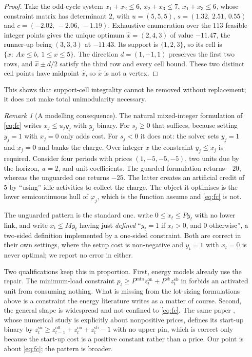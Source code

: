 \documentclass[review,11pt]{elsarticle}
\theoremstyle{remark}
\newtheorem{remark}[theorem]{Remark}
\theoremstyle{definition}
\begin{document}
\begin{proof}
Take the odd-cycle system $x_1+x_2\le6$, $x_2+x_3\le7$, $x_1+x_3\le6$, whose constraint
matrix has determinant $2$, with $u=(5,5,5)$, $s=(1.32,\,2.51,\,0.55)$ and
$c=(-2.02,\,-2.06,\,-1.19)$. Exhaustive enumeration over the $113$ feasible integer
points gives the unique optimum $\hat x=(2,4,3)$ of value $-11.47$, the runner-up being
$(3,3,3)$ at $-11.43$. Its support is $\{1,2,3\}$, so its cell is
$\{x:\ Ax\le b,\ 1\le x\le5\}$. The direction $d=(1,-1,1)$ preserves the first two
rows, and $\hat x\pm d/2$ satisfy the third row and every cell bound. These two distinct
cell points have midpoint $\hat x$, so $\hat x$ is not a vertex.
\end{proof}

This shows that support-cell integrality cannot be removed without replacement; it does
not make total unimodularity necessary.

\begin{remark}[A modelling consequence]\label{rem:model}
The natural mixed-integer formulation of \eqref{eq:fc} writes $x_j\le u_jy_j$ with $y_j$
binary. For $s_j\ge0$ that suffices, because setting $y_j=1$ with $x_j=0$ only adds
cost. For $s_j<0$ it does not: the solver sets $y_j=1$ and $x_j=0$ and banks the charge.
Over integer $x$ the constraint $y_j\le x_j$ is required. Consider four periods with
prices $(1,-5,-5,-5)$, two units due by the horizon, $u=2$, and unit coefficients. The
guarded formulation returns $-20$, whereas the unguarded one returns $-25$. The latter
creates an artificial credit of $5$ by ``using'' idle activities to collect the charge.
The object it optimises is the lower
semicontinuous hull of $\varphi_j$, which is the function \cite{kya14} assume and
\eqref{eq:fc} is not.

The unguarded pattern is the standard one. \cite{apr15} write $0\le x_t\le Py_t$ with no
lower link, and \cite{lcw01} write $x_t\le My_t$ having just \emph{defined}
``$y_t=1$ if $x_t>0$, and $0$ otherwise'', a two-sided definition implemented by a
one-sided constraint. Both are correct in their own settings, where the setup cost is
non-negative and $y_t=1$ with $x_t=0$ is never optimal; we report no error in either.

Two qualifications keep this in proportion. First, energy models already use the repair.
The minimum-load constraint
$p_t\ge P^{\min}z^{\mathrm{on}}_t+P^{\mathrm{sb}}z^{\mathrm{sb}}_t$ in
\cite{raheli23} forbids an activated unit from consuming nothing. What is missing
from the lot-sizing formulations above is a constraint the energy literature writes as a
matter of course. Second, the general shape is widespread and not confined to
\eqref{eq:fc}. The same paper \cite{raheli23}, whose numerical study is explicitly about
nonpositive prices, defines its start-up binary by
$z^{\mathrm{su}}_t\ge z^{\mathrm{off}}_{t-1}+z^{\mathrm{on}}_t+z^{\mathrm{sb}}_t-1$ with no
upper pin, which is correct only because the start-up cost is a positive constant rather
than a price. Our point is about \eqref{eq:fc}; the pattern is broader.
\end{remark}
\end{document}
